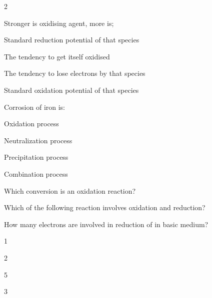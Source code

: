 \documentclass[10pt,a4paper]{article}
\begin{document}
\begin{multicols}{2}
\begin{questions}
\item Stronger is oxidising agent, more is;
\begin{options}
  \item Standard reduction potential of that species
  \item The tendency to get itself oxidised
  \item The tendency to lose electrons by that species
  \item Standard oxidation potential of that species
\end{options}

\item Corrosion of iron is:
\begin{options}
  \item Oxidation process
  \item Neutralization process
  \item Precipitation process
  \item Combination process
\end{options}

\item Which conversion is an oxidation reaction?
\begin{options}
  \item {}
  \item {}
  \item {}
  \item {}
\end{options}

\item Which of the following reaction involves oxidation and reduction?
\begin{options}
  \item {}
  \item {}
  \item {}
  \item {}
\end{options}

\item How many electrons are involved in reduction of  in basic medium?
\begin{options}
  \item 1
  \item 2
  \item 5
  \item 3
\end{options}


\end{questions}
\end{multicols}
\end{document}
